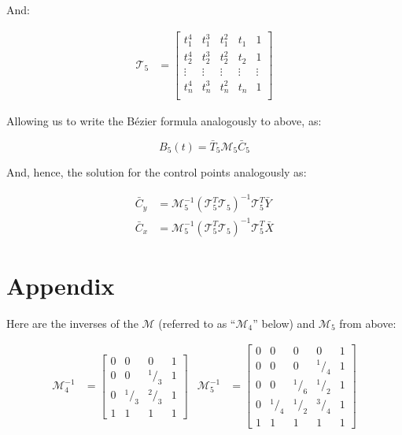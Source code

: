 \documentclass{article}
\newcommand{\lfrac}[2]{\ensuremath{^#1/_#2}}
\begin{document}
And:

\begin{align*}
  \mathcal{T}_5 &= \left[
    \begin{array}{ccccc}
       t_1^4 &  t_1^3 &  t_1^2 &  t_1   &      1 \\
       t_2^4 &  t_2^3 &  t_2^2 &  t_2   &      1 \\
      \vdots & \vdots & \vdots & \vdots & \vdots \\
       t_n^4 &  t_n^3 &  t_n^2 &  t_n   &      1 \\
    \end{array}
  \right]
\end{align*}

Allowing us to write the B\'ezier formula analogously to above, as:

\[B_5(t)=\bar{T}_5\mathcal{M}_5\bar{C}_5\]

And, hence, the solution for the control points analogously as:

\begin{align*}
  \bar{C}_y &= \mathcal{M}_5^{-1}(\mathcal{T}_5^T\mathcal{T}_5)^{-1}\mathcal{T}_5^T\bar{Y} \\
  \bar{C}_x &= \mathcal{M}_5^{-1}(\mathcal{T}_5^T\mathcal{T}_5)^{-1}\mathcal{T}_5^T\bar{X}
\end{align*}

\section{Appendix}

Here are the inverses of the $\mathcal{M}$ (referred to as ``$\mathcal{M}_4$'' below) and $\mathcal{M}_5$ from above:

\begin{align*}
  \mathcal{M}_4^{-1} &= \left[\begin{array}{cccc}
    0 & 0 & 0 & 1 \\
    0 & 0 & \lfrac{1}{3} & 1 \\
    0 & \lfrac{1}{3} & \lfrac{2}{3} & 1 \\
    1 & 1 & 1 & 1
  \end{array}\right] &
  \mathcal{M}_5^{-1} &= \left[\begin{array}{ccccc}
    0 & 0 & 0 & 0 & 1 \\
    0 & 0 & 0 & \lfrac{1}{4} & 1 \\
    0 & 0 & \lfrac{1}{6} & \lfrac{1}{2} & 1 \\
    0 & \lfrac{1}{4} & \lfrac{1}{2} & \lfrac{3}{4} & 1 \\
    1 & 1 & 1 & 1 & 1
  \end{array}\right]
\end{align*}
\end{document}
